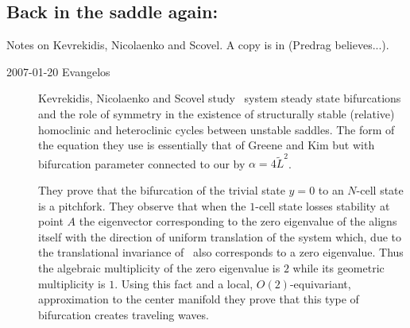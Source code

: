 \subsection{Back in the saddle again:}
\label{s:KNSks90}

Notes on Kevrekidis, Nicolaenko and Scovel. A copy is in
(Predrag believes...).

\begin{description}

\item[2007-01-20 Evangelos]
Kevrekidis, Nicolaenko and Scovel study \KS\ system
steady state bifurcations and the role of symmetry in the
existence of structurally stable (relative) homoclinic and
heteroclinic cycles between unstable saddles. The form  of
the equation they use is essentially that of Greene and Kim but
with bifurcation parameter connected to our by
$\alpha=4\tilde{L}^2$.


They prove that the bifurcation of the trivial state $y=0$ to
an $N$-cell state is a pitchfork. They observe that when the
$1$-cell state losses stability at point $A$ the eigenvector
corresponding to the zero eigenvalue of the {\stabmat}
aligns itself with the direction of uniform translation of the
system which, due to the translational invariance of \KSe\,
also corresponds to a zero eigenvalue. Thus the algebraic
multiplicity of the zero eigenvalue is $2$ while its geometric
multiplicity is $1$. Using this fact and a local,
$O(2)$-equivariant, approximation to the center manifold they
prove that this type of bifurcation creates traveling waves.


\end{description}
